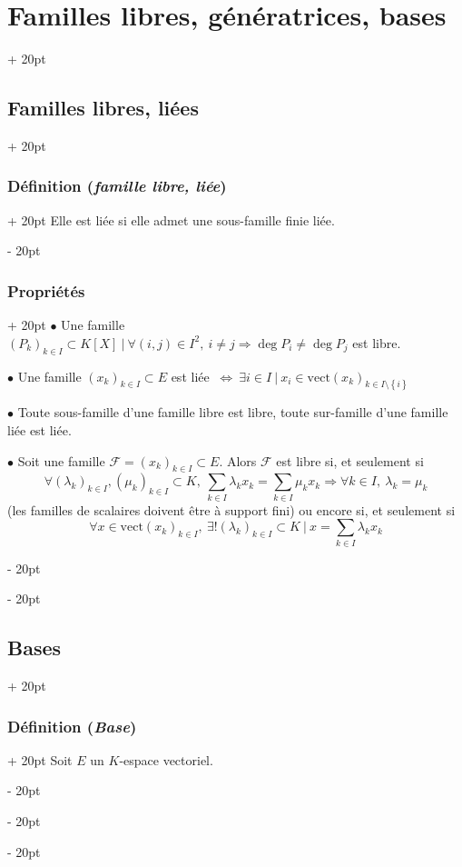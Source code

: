 \documentclass[a4paper, 12pt, twoside]{article}
\newcommand{\set}[1]{\left\{ #1 \right\}}
\newcommand{\ssi}{\ \Leftrightarrow \ }
\newcommand{\ind}[1][20pt]{\advance\leftskip + #1}
\newcommand{\deind}[1][20pt]{\advance\leftskip - #1}
\newenvironment{indt}[2][20pt]{#2 \par \ind[#1]}{\par \deind} %
\begin{document}
\begin{indt}{\section{Familles libres, génératrices, bases}}
\begin{indt}{\subsection{Familles libres, liées}}
\begin{indt}{\subsubsection{Définition (\textit{famille libre, liée})}}
                Elle est liée si elle admet une sous-famille finie liée.
            \end{indt}
            
            \vspace{12pt}
            
            \begin{indt}{\subsubsection{Propriétés}}
                $\bullet$ Une famille $(P_k)_{k \in I} \subset K[X]\ |\ \forall (i, j) \in I^2,\ i \neq j \Rightarrow \deg P_i \neq \deg P_j$ est libre.
                
                \vspace{12pt}
                
                $\bullet$ Une famille $(x_k)_{k \in I} \subset E$ est liée $\ssi \exists i \in I\ |\ x_i \in \mathrm{vect}(x_k)_{k \in I \setminus \set i}$
                
                \vspace{12pt}
                
                $\bullet$ Toute sous-famille d'une famille libre est libre, toute sur-famille d'une famille liée est liée.
                
                \vspace{12pt}
                
                $\bullet$ Soit une famille $\mathcal F = (x_k)_{k \in I} \subset E$. Alors $\mathcal F$ est libre si, et seulement si
                    \[ \forall (\lambda_k)_{k \in I}, (\mu_k)_{k \in I} \subset K,\ \sum_{k \in I} \lambda_k x_k = \sum_{k \in I} \mu_k x_k \Rightarrow \forall k \in I,\ \lambda_k = \mu_k \]
                (les familles de scalaires doivent être à support fini) ou encore si, et seulement si
                    \[ \forall x \in \mathrm{vect}(x_k)_{k \in I},\ \exists! (\lambda_k)_{k \in I} \subset K\ |\ x = \sum_{k \in I} \lambda_k x_k \]
            \end{indt}
        \end{indt}
        
        \vspace{12pt}
        
        \begin{indt}{\subsection{Bases}}
            \begin{indt}{\subsubsection{Définition (\textit{Base})}}
                Soit $E$ un $K$-espace vectoriel.
                

\end{indt}
\end{indt}
\end{indt}
\end{document}
